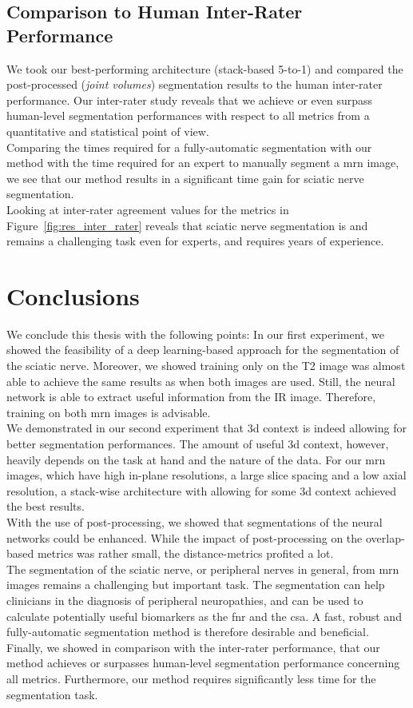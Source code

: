 \subsection{Comparison to Human Inter-Rater Performance}
We took our best-performing architecture (stack-based 5-to-1) and compared the post-processed (\textit{joint volumes}) segmentation results to the human inter-rater performance. Our inter-rater study reveals that we achieve or even surpass human-level segmentation performances with respect to all metrics from a quantitative and statistical point of view.\\
Comparing the times required for a fully-automatic segmentation with our method with the time required for an expert to manually segment a \gls{mrn} image, we see that our method results in a significant time gain for sciatic nerve segmentation.\\
Looking at inter-rater agreement values for the metrics in Figure~\ref{fig:res_inter_rater} reveals that sciatic nerve segmentation is and remains a challenging task even for experts, and requires years of experience.

\section{Conclusions} \label{disc:conclusions}
We conclude this thesis with the following points:
In our first experiment, we showed the feasibility of a deep learning-based approach for the segmentation of the sciatic nerve. Moreover, we showed training only on the T2 image was almost able to achieve the same results as when both images are used. Still, the neural network is able to extract useful information from the IR image. Therefore, training on both \gls{mrn} images is advisable.\\
We demonstrated in our second experiment that \gls{3d} context is indeed allowing for better segmentation performances. The amount of useful \gls{3d} context, however, heavily depends on the task at hand and the nature of the data. For our \gls{mrn} images, which have high in-plane resolutions, a large slice spacing and a low axial resolution, a stack-wise architecture with allowing for some \gls{3d} context achieved the best results.\\
With the use of post-processing, we showed that segmentations of the neural networks could be enhanced. While the impact of post-processing on the overlap-based metrics was rather small, the distance-metrics profited a lot.\\
The segmentation of the sciatic nerve, or peripheral nerves in general, from \gls{mrn} images remains a challenging but important task. The segmentation can help clinicians in the diagnosis of peripheral neuropathies, and can be used to calculate potentially useful biomarkers as the \gls{fnr} and the \gls{csa}. A fast, robust and fully-automatic segmentation method is therefore desirable and beneficial. Finally, we showed in comparison with the inter-rater performance, that our method achieves or surpasses human-level segmentation performance concerning all metrics. Furthermore, our method requires significantly less time for the segmentation task.

\endinput